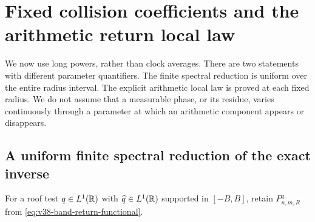 \section{Fixed collision coefficients and the arithmetic return local law}
\label{sec:v40-fixed-count-local}
We now use long powers, rather than clock averages. There are two
statements with different parameter quantifiers. The finite spectral
reduction is uniform over the entire radius interval. The explicit
arithmetic local law is proved at each fixed radius. We do not assume
that a measurable phase, or its residue, varies continuously through
a parameter at which an arithmetic component appears or disappears.

\subsection{A uniform finite spectral reduction of the exact inverse}
For a roof test $q\in L^1(\mathbb R)$ with $\widehat q\in L^1(\mathbb R)$ supported
in $[-B,B]$, retain $P^q_{n,m,R}$ from
\eqref{eq:v38-band-return-functional}.

